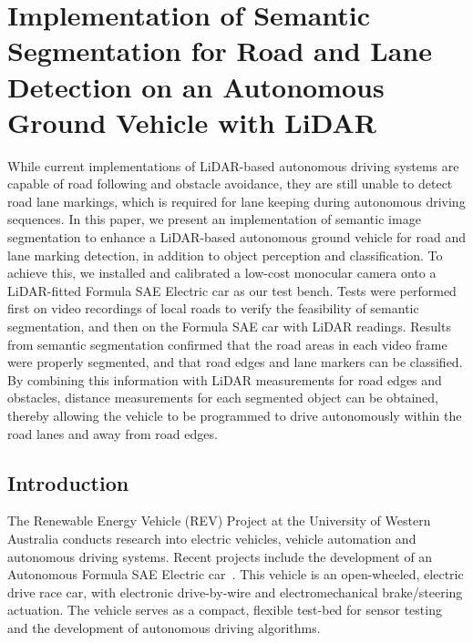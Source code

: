 
\chapter[Semantic Segmentation for Road and Lane Detection]{Implementation of Semantic Segmentation for Road and Lane Detection on an Autonomous Ground Vehicle with LiDAR}
\label{ch:semseg}

\ifpdf
	\graphicspath{{Chapter5/Figs/Raster/}{Chapter5/Figs/PDF/}{Chapter5/Figs/}}
\else
	\graphicspath{{Chapter5/Figs/Vector/}{Chapter5/Figs/}}
\fi

While current implementations of LiDAR-based autonomous driving systems are capable of road following and obstacle avoidance, they are still unable to detect road lane markings, which is required for lane keeping during autonomous driving sequences. In this paper, we present an implementation of semantic image segmentation to enhance a LiDAR-based autonomous ground vehicle for road and lane marking detection, in addition to object perception and classification. To achieve this, we installed and calibrated a low-cost monocular camera onto a LiDAR-fitted Formula SAE Electric car as our test bench. Tests were performed first on video recordings of local roads to verify the feasibility of semantic segmentation, and then on the Formula SAE car with LiDAR readings. Results from semantic segmentation confirmed that the road areas in each video frame were properly segmented, and that road edges and lane markers can be classified. By combining this information with LiDAR measurements for road edges and obstacles, distance measurements for each segmented object can be obtained, thereby allowing the vehicle to be programmed to drive autonomously within the road lanes and away from road edges.

\section{Introduction}
The Renewable Energy Vehicle (REV) Project at the University of Western Australia conducts research into electric vehicles, vehicle automation and autonomous driving systems. Recent projects include the development of an Autonomous Formula SAE Electric car~\cite{t._drage_integration_2014}. This vehicle is an open-wheeled, electric drive race car, with electronic drive-by-wire and electromechanical brake/steering actuation. The vehicle serves as a compact, flexible test-bed for sensor testing and the development of autonomous driving algorithms.

